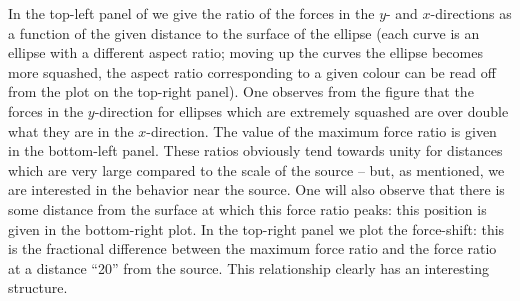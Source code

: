 \documentclass[amsmath,amssymb,12pt,eqsecnum]{revtex4}
\begin{document}
In the top-left panel of  we give the ratio of the forces in the $y$- and $x$-directions as a function of the given distance to the surface of the ellipse (each curve is an ellipse with a different aspect ratio; moving up the curves the ellipse becomes more squashed,  the aspect ratio corresponding to a given colour can be read off from the plot on the top-right panel). One observes from the figure that the forces in the $y$-direction for ellipses which are extremely squashed are over double what they are in the $x$-direction. The value of the maximum force ratio is given in the bottom-left panel. These ratios obviously tend towards unity for distances which are very large compared to the scale of the source -- but, as mentioned, we are interested in the behavior near the source. One will also observe that there is some distance from the surface at which this force ratio peaks: this position is given in the bottom-right plot. In the top-right panel we plot the force-shift: this is the fractional difference between the maximum force ratio and the force ratio at a distance ``20'' from the source. This relationship clearly has an interesting structure.
\end{document}
